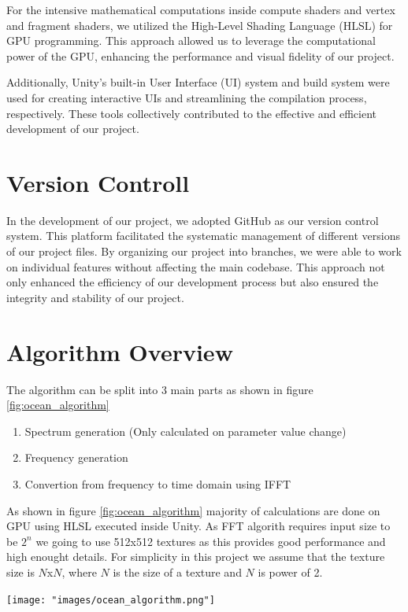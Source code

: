 For the intensive mathematical computations inside compute shaders and vertex and fragment shaders, we utilized the High-Level Shading Language (HLSL) for GPU programming. This approach allowed us to leverage the computational power of the GPU, enhancing the performance and visual fidelity of our project.

Additionally, Unity’s built-in User Interface (UI) system and build system were used for creating interactive UIs and streamlining the compilation process, respectively. These tools collectively contributed to the effective and efficient development of our project.

\section{Version Controll}
In the development of our project, we adopted GitHub as our version control system. This platform facilitated the systematic management of different versions of our project files. By organizing our project into branches, we were able to work on individual features without affecting the main codebase. This approach not only enhanced the efficiency of our development process but also ensured the integrity and stability of our project.

\section{Algorithm Overview}
The algorithm can be split into 3 main parts as shown in figure \ref{fig:ocean_algorithm}
\begin{enumerate}
    \item Spectrum generation (Only calculated on parameter value change)
    \item Frequency generation
    \item Convertion from frequency to time domain using IFFT
\end{enumerate}
As shown in figure \ref{fig:ocean_algorithm} majority of calculations are done on GPU using HLSL executed inside Unity. As FFT algorith requires input size to be $2^n$ we going to use 512x512 textures as this provides good performance and high enought details. For simplicity in this project we assume that the texture size is $N$x$N$, where $N$ is the size of a texture and $N$ is power of 2.

\begin{minipage}{1\textwidth}
    \centering
    \texttt{[image: "images/ocean\_algorithm.png"]}
    \label{fig:ocean_algorithm}
\end{minipage}

